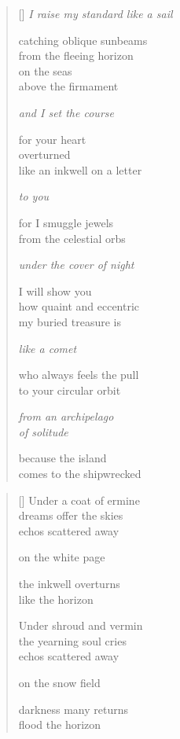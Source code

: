 \documentclass[12pt,a4paper]{article}
\begin{document}

\newpage

\poemtitle{}

\settowidth{\versewidth}{I raise my standard like a sail}

\bigskip

\begin{verse}[\versewidth]
  \emph{I raise my standard like a sail}

  catching oblique sunbeams \\
  from the fleeing horizon \\
  on the seas \\
  above the firmament

  \emph{and I set the course}

  for your heart \\
  overturned \\
  like an inkwell on a letter

  \emph{to you}

  for I smuggle jewels \\
  from the celestial orbs

  \emph{under the cover of night}

  I will show you \\
  how quaint and eccentric \\
  my buried treasure is

  \emph{like a comet}

  who always feels the pull \\
  to your circular orbit

  \emph{from an archipelago \\
  of solitude}

  because the island \\
  comes to the shipwrecked
\end{verse}


\newpage

\poemtitle{}

\settowidth{\versewidth}{Under shroud and vermin}

\bigskip

\begin{verse}[\versewidth]
  Under a coat of ermine \\
  dreams offer the skies \\
  echos scattered away

  on the white page

  the inkwell overturns \\
  like the horizon

  Under shroud and vermin \\
  the yearning soul cries \\
  echos scattered away

  on the snow field

  darkness many returns \\
  flood the horizon
\end{verse}
\end{document}
